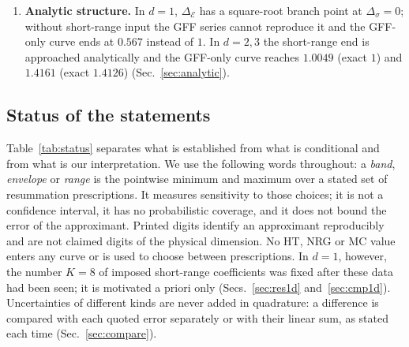 \documentclass[11pt,a4paper]{article}
\numberwithin{equation}{section}
\newcommand{\De}{\Delta_{\mathcal E}}   %
\newcommand{\Ds}{\Delta_\sigma}
\newcommand{\Ae}{A_\epsilon}
\newcommand{\sci}[2]{#1\times10^{#2}}
\begin{document}
\begin{enumerate}
$-\Ae$ with $\Ae=9\pi^2/\Gamma(\frac14)^4$, $\frac98$ and
$\frac94[\Gamma(\frac94)/\Gamma(\frac34)]^2$ for $d=1,2,3$. In $d=1$ the regular
one-instanton sector predicts $C_n\sim K_I(-1/\Ae)^n\Gamma(n+4)$ with
$K_I=\sci{6.2466}{-3}$; the coefficients have the predicted sign, but at $n=8$ they are
only $0.158$ of this leading form and still rising (Sec.~\ref{sec:largeorder}).
\item \textbf{Analytic structure.} In $d=1$, $\De$ has a square-root branch point at
$\Ds=0$; without short-range input the GFF series cannot reproduce it and the GFF-only
curve ends at $0.567$ instead of $1$. In $d=2,3$ the short-range end is approached
analytically and the GFF-only curve reaches $1.0049$ (exact $1$) and $1.4161$ (exact
$1.4126$) (Sec.~\ref{sec:analytic}).
\end{enumerate}

\subsection{Status of the statements}\label{sec:status}
Table~\ref{tab:status} separates what is established from what is conditional and from
what is our interpretation. We use the following words throughout: a \emph{band},
\emph{envelope} or \emph{range} is the pointwise minimum and maximum over a stated set of
resummation prescriptions. It measures sensitivity to those choices; it is not a
confidence interval, it has no probabilistic coverage, and it does not bound the
error of the approximant. Printed digits identify an approximant reproducibly and are
not claimed digits of the physical dimension. No HT, NRG or MC value enters any curve
or is used to choose between prescriptions. In $d=1$, however, the number $K=8$ of imposed
short-range coefficients was fixed after these data had been seen; it is motivated a priori
only (Secs.~\ref{sec:res1d} and~\ref{sec:cmp1d}). Uncertainties of different kinds are never
added in quadrature: a difference is compared with each quoted error separately or with
their linear sum, as stated each time (Sec.~\ref{sec:compare}).
\end{document}
